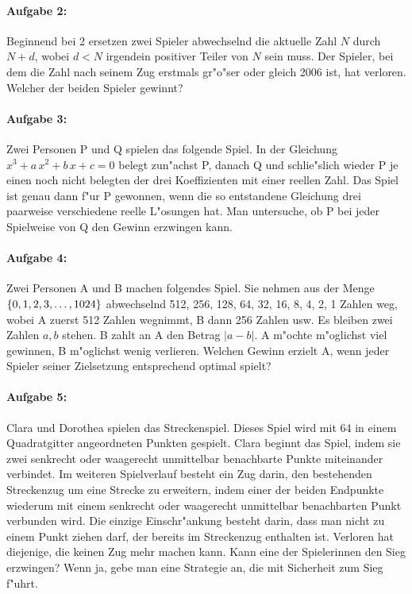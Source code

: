 \documentclass[a4paper,11pt]{article}
\begin{document}
\paragraph*{Aufgabe 2:} 
Beginnend bei 2 ersetzen zwei Spieler abwechselnd die aktuelle Zahl $N$ durch
$N+d$, wobei $d<N$ irgendein positiver Teiler von $N$ sein muss. Der Spieler,
bei dem die Zahl nach seinem Zug erstmals gr"o"ser oder gleich 2006 ist, hat
verloren. Welcher der beiden Spieler gewinnt?
\paragraph*{Aufgabe 3:} 
Zwei Personen P und Q spielen das folgende Spiel. In der Gleichung
$x^3+a\,x^2+b\,x+c=0$ belegt zun"achst P, danach Q und schlie"slich wieder P
je einen noch nicht belegten der drei Koeffizienten mit einer reellen
Zahl. Das Spiel ist genau dann f"ur P gewonnen, wenn die so entstandene
Gleichung drei paarweise verschiedene reelle L"osungen hat. Man untersuche, ob
P bei jeder Spielweise von Q den Gewinn erzwingen kann.
\paragraph*{Aufgabe 4:} 
Zwei Personen A und B machen folgendes Spiel. Sie nehmen aus der Menge
$\left\{0, 1, 2, 3, \ldots, 1024\right\}$ abwechselnd 512, 256, 128, 64, 32, 16, 8, 4,
2, 1 Zahlen weg, wobei A zuerst 512 Zahlen wegnimmt, B dann 256 Zahlen usw. Es
bleiben zwei Zahlen $a,b$ stehen. B zahlt an A den Betrag $|a-b|$. A m"ochte
m"oglichst viel gewinnen, B m"oglichst wenig verlieren. Welchen Gewinn erzielt
A, wenn jeder Spieler seiner Zielsetzung entsprechend optimal spielt?
\paragraph*{Aufgabe 5:} 
Clara und Dorothea spielen das Streckenspiel. Dieses Spiel wird mit 64 in
einem Quadratgitter angeordneten Punkten gespielt.  Clara beginnt das Spiel,
indem sie zwei senkrecht oder waagerecht unmittelbar benachbarte Punkte
miteinander verbindet. Im weiteren Spielverlauf besteht ein Zug darin, den
bestehenden Streckenzug um eine Strecke zu erweitern, indem einer der beiden
Endpunkte wiederum mit einem senkrecht oder waagerecht unmittelbar
benachbarten Punkt verbunden wird. Die einzige Einschr"ankung besteht darin,
dass man nicht zu einem Punkt ziehen darf, der bereits im Streckenzug
enthalten ist. Verloren hat diejenige, die keinen Zug mehr machen kann. Kann
eine der Spielerinnen den Sieg erzwingen? Wenn ja, gebe man eine Strategie an,
die mit Sicherheit zum Sieg f"uhrt.
\end{document}

